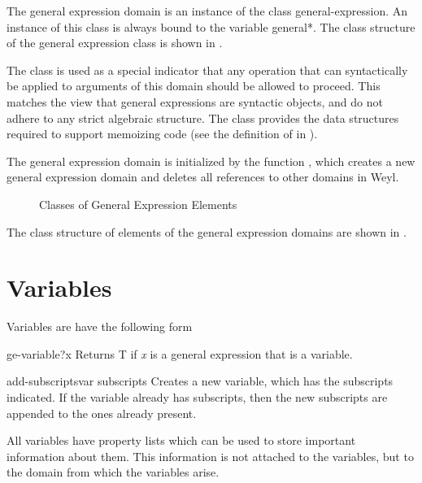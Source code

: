 The general expression domain is an instance of the class
general-expression. An instance of this class is always bound to the
variable {\sf *general*}.  The class structure of the general
expression class is shown in .
  
The class  is used as a special
indicator that any operation that can syntactically
be applied to arguments of this domain should be allowed
to proceed. This matches the view that general expressions
are syntactic objects, and do not adhere to any strict
algebraic structure. The  class provides
the data structures required to support memoizing code
(see the definition of  in ). 
  
The general expression domain is initialized by the function
, which creates a new general expression domain
and deletes all references to other domains in Weyl.
  
\begin{figure}
\begin{center}
\end{center}
\caption{Classes of General Expression
Elements\label{GenExprElts:Fig}}
\end{figure}

The class structure of elements of the general expression
domains are shown in .
  

\section{Variables}

Variables are have the following form 


\begin{functiondef}{ge-variable?}{x}
Returns {\sf T} if {\em x} is a general expression that is a variable.
\end{functiondef}

\begin{functiondef}{add-subscripts}{var \rest subscripts}
Creates a new variable, which has the subscripts indicated.  If the
variable already has subscripts, then the new subscripts are appended
to the ones already present.
\end{functiondef}

All variables have property lists which can be used to store important
information about them.  This information is not attached to the
variables, but to the domain from which the variables arise.

